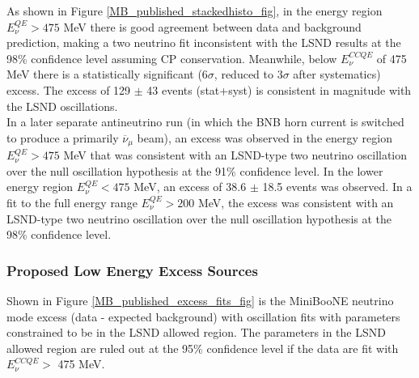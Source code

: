 As shown in Figure \ref{MB_published_stackedhisto_fig}, in the energy region $E_\nu^{QE} > 475$ MeV there is good agreement between data and background prediction, making a two neutrino fit inconsistent with the LSND results at the 98\% confidence level assuming CP conservation. Meanwhile, below $E_\nu^{CCQE}$ of 475 MeV there is a statistically significant (6$\sigma$, reduced to 3$\sigma$ after systematics) excess. The excess of 129 $\pm$ 43 events (stat+syst) is consistent in magnitude with the LSND oscillations.\\


In a later separate antineutrino run (in which the BNB horn current is switched to produce a primarily $\overline{\nu}_\mu$ beam), an excess was observed in the energy region $E_\nu^{QE} > 475$ MeV that was consistent with an LSND-type two neutrino oscillation over the null oscillation hypothesis at the 91\% confidence level. In the lower energy region $E_\nu^{QE} < 475$ MeV, an excess of 38.6 $\pm$ 18.5 events was observed. In a fit to the full energy range $E_\nu^{QE} > 200$ MeV, the excess was consistent with an LSND-type two neutrino oscillation over the null oscillation hypothesis at the 98\% confidence level.\\


\subsubsection{Proposed Low Energy Excess Sources}

Shown in Figure \ref{MB_published_excess_fits_fig} is the MiniBooNE neutrino mode excess (data - expected background) with oscillation fits with parameters constrained to be in the LSND allowed region. The parameters in the LSND allowed region are ruled out at the 95\% confidence level if the data are fit with $E_\nu^{CCQE}>$ 475 MeV. \\

